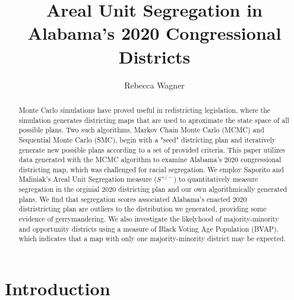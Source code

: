 \documentclass{article}
\title{Areal Unit Segregation in Alabama's 2020 Congressional Districts }
\author{Rebecca Wagner}
\date{}
\begin{document}
\maketitle

\begin{abstract}

Monte Carlo simulations have proved useful in redistricting legislation, where the simulation generates districting maps that are used to aproximate the state space of all possible plans. Two such algorithms, Markov Chain Monte Carlo (MCMC) and Sequential Monte Carlo (SMC), begin with a "seed" districting plan and iteratively generate new possible plans according to a set of provided criteria. This paper utilizes data generated with the MCMC algorithm to examine Alabama's 2020 congressional districting map, which was challenged for racial segregation. We employ Saporito and Maliniak's\cite{SAPORITO2022} Areal Unit Segregation measure ($S^{+/-}$) to quantitatively measure segregation in the orginial 2020 districting plan and our own algorithmically generated plans. We find that segregation scores associated Alabama's enacted 2020 distristricting plan are outliers to the distribution we generated, providing some evidence of gerrymandering. We also investigate the likelyhood of majority-minority and opportunity districts using a measure of Black Voting Age Population (BVAP), which indicates that a map with only one majority-minority district may be expected.

\end{abstract}

\section{Introduction}
\end{document}
